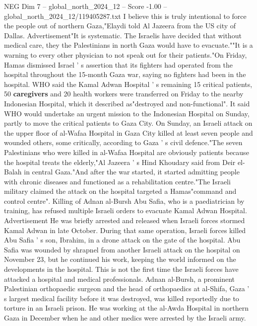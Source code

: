 \begin{textsample}{NEG Dim 7 – global\_north\_2024\_12 – Score -1.00 – global\_north\_2024\_12/119405287.txt}
I believe this is truly intentional to force the people out of northern Gaza,"Elaydi told Al Jazeera from the US city of Dallas.
Advertisement"It is systematic.
The Israelis have decided that without medical care, they the Palestinians in north Gaza would have to evacuate.""It is a warning to every other physician to not speak out for their patients."On Friday, Hamas dismissed Israel ' s assertion that its fighters had operated from the hospital throughout the 15-month Gaza war, saying no fighters had been in the hospital.
WHO said the Kamal Adwan Hospital ' s remaining 15 critical patients, 50 \textbf{caregivers} and 20 health workers were transferred on Friday to the nearby Indonesian Hospital, which it described as"destroyed and non-functional".
It said WHO would undertake an urgent mission to the Indonesian Hospital on Sunday, partly to move the critical patients to Gaza City.
On Sunday, an Israeli attack on the upper floor of al-Wafaa Hospital in Gaza City killed at least seven people and wounded others, some critically, according to Gaza ' s civil defence."The seven Palestinians who were killed in al-Wafaa Hospital are obviously patients because the hospital treats the elderly,"Al Jazeera ' s Hind Khoudary said from Deir el-Balah in central Gaza."And after the war started, it started admitting people with chronic diseases and functioned as a rehabilitation centre."The Israeli military claimed the attack on the hospital targeted a Hamas"command and control centre".
Killing of Adnan al-Bursh Abu Safia, who is a paediatrician by training, has refused multiple Israeli orders to evacuate Kamal Adwan Hospital.
Advertisement He was briefly arrested and released when Israeli forces stormed Kamal Adwan in late October.
During that same operation, Israeli forces killed Abu Safia ' s son, Ibrahim, in a drone attack on the gate of the hospital.
Abu Safia was wounded by shrapnel from another Israeli attack on the hospital on November 23, but he continued his work, keeping the world informed on the developments in the hospital.
This is not the first time the Israeli forces have attacked a hospital and medical professionals.
Adnan al-Bursh, a prominent Palestinian orthopaedic surgeon and the head of orthopaedics at al-Shifa, Gaza ' s largest medical facility before it was destroyed, was killed reportedly due to torture in an Israeli prison.
He was working at the al-Awda Hospital in northern Gaza in December when he and other medics were arrested by the Israeli army.

\end{textsample}

